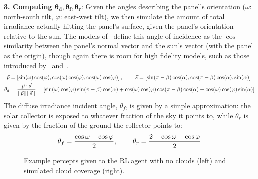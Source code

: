 \documentclass[11pt]{article}
\begin{document}
{\bf 3. Computing $\pmb{\theta_d, \theta_f, \theta_r}$}: Given the angles describing the panel's orientation ($\omega$: north-south tilt, $\varphi$: east-west tilt), we then simulate the amount of total irradiance actually hitting the panel's surface, given the panel's orientation relative to the sun. The models of~\citet{masters2013renewable} define this angle of incidence as the $\cos$-similarity between the panel's normal vector and the sun's vector (with the panel as the origin), though again there is room for high fidelity models, such as those introduced by~\citet{andersen1980comments} and~\citet{klein1977calculation}.
\begin{align*}
\vec{p} &= \left[ \sin(\omega)  \cos(\varphi), \cos(\omega)  \cos(\varphi), \cos(\omega) \cos(\varphi) \right], \hspace{8mm} \vec{s} = \left[ \sin(\pi - \beta)  \cos(\alpha), \cos(\pi - \beta)  \cos(\alpha), \sin(\alpha) \right] \\
\theta_d &= \frac{\vec{p} \cdot \vec{s}}{||\vec{p}|| ||\vec{s} ||} = \left[ \sin(\omega)  \cos(\varphi)  \sin(\pi - \beta)  \cos(\alpha) + \cos(\omega)  \cos(\varphi)  \cos(\pi - \beta)  \cos(\alpha) +  \cos(\omega) \cos(\varphi)  \sin(\alpha)  \right]
\end{align*}
The diffuse irradiance incident angle, $\theta_f$, is given by a simple approximation: the solar collector is exposed to whatever fraction of the sky it points to, while $\theta_r$ is given by the fraction of the ground the collector points to:
\begin{equation}
\theta_f = \frac{\cos \omega + \cos \varphi}{2}, \hspace{8mm} \theta_r = \frac{2 - \cos\omega - \cos \varphi}{2}
\end{equation}
\begin{figure}[t]
\begin{center}
 \hspace{16mm} %
\caption{Example percepts given to the RL agent with no clouds (left) and simulated cloud coverage (right).}
\end{center}
\end{figure}
\end{document}
